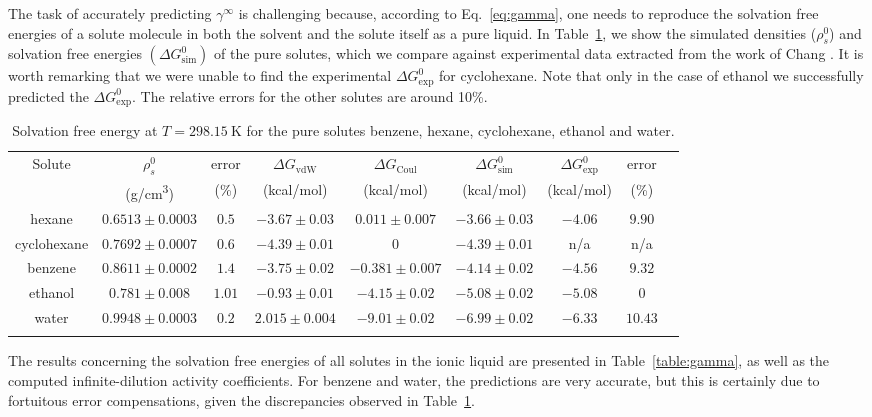 \documentclass[3p,twocolumn]{elsarticle}
\begin{document}
The task of accurately predicting $\gamma^\infty$ is challenging because, according to Eq.~\eqref{eq:gamma}, one needs to reproduce the solvation free energies of a solute molecule in both the solvent and the solute itself as a pure liquid.
In Table~\ref{table:mu_solutes}, we show the simulated densities ($\rho^0_s$) and solvation free energies $(\Delta G^{0}_\text{sim})$ of the pure solutes, which we compare against experimental data extracted from the work of Chang \cite{Chang_2009}.
It is worth remarking that we were unable to find the experimental $\Delta G^{0}_\text{exp}$ for cyclohexane.
Note that only in the case of ethanol we successfully predicted the $\Delta G^{0}_\text{exp}$.
The relative errors for the other solutes are around 10\%.

\begin{table}
	\centering
	\caption{Solvation free energy at $T = 298.15~\text{K}$ for the pure solutes benzene, hexane, cyclohexane, ethanol and water.}
	\begin{adjustbox}{max width=\textwidth}
		\begin{tabular}{ccccccccc}
			\hline\hline
			Solute & $\rho^0_s$ & error & $\Delta G_\text{vdW}$  & $\Delta G_\text{Coul}$  & $\Delta G^0_\text{sim}$ & $\Delta G^0_\text{exp}$   & error \\
			& (g/cm\textsuperscript{3}) & (\%) & (kcal/mol) &  (kcal/mol) &  (kcal/mol)   & (kcal/mol)   & (\%) \\
			\hline
			hexane & $0.6513 \pm 0.0003$ & $0.5$ & $-3.67  \pm  0.03$ & $0.011 \pm 0.007$ & $-3.66 \pm 0.03$ & $-4.06$ & $9.90$ \\
			cyclohexane & $0.7692 \pm 0.0007$ & $0.6$ & $-4.39 \pm 0.01$ & $0$ & $-4.39 \pm 0.01$ & n/a & n/a  \\
			benzene & $0.8611 \pm 0.0002$ & $1.4$ & $-3.75  \pm 0.02$ & $-0.381 \pm 0.007$ & $-4.14 \pm 0.02$ & $-4.56$ & $9.32$  \\
			ethanol & $0.781 \pm 0.008$ & $1.01$  & $-0.93 \pm 0.01$ & $-4.15 \pm 0.02$  & $-5.08  \pm 0.02$  & $-5.08$ & $0$ \\
			water & $0.9948 \pm 0.0003$ & $0.2$ & $2.015 \pm 0.004$ & $-9.01 \pm 0.02$ & $-6.99 \pm 0.02$ & $-6.33$  & $10.43$ \\
			\hline\hline
			\label{table:mu_solutes} 
		\end{tabular}
	\end{adjustbox}
\end{table}

The results concerning the solvation free energies of all solutes in the ionic liquid are presented in Table~\ref{table:gamma}, as well as the computed infinite-dilution activity coefficients.
For benzene and water, the predictions are very accurate, but this is certainly due to fortuitous error compensations, given the discrepancies observed in Table~\ref{table:mu_solutes}.
\end{document}
